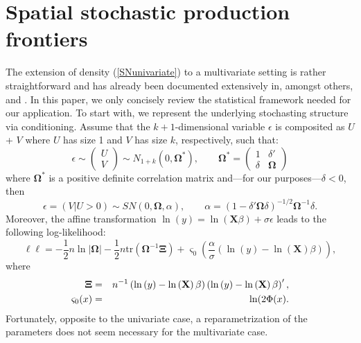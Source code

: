 \documentclass[11pt,parskip,abstracton,notitlepage]{scrartcl}
\begin{document}
\section{Spatial stochastic production frontiers}\label{sub:multisn}
%
The extension of density (\ref{SNunivariate}) to a multivariate setting is rather straightforward and has already been documented extensively in, amongst others, \citet{AZZALINI1999} \citet{AZZALINI2005} and \citet{arellano2006unification}. In this paper, we only concisely review the statistical framework needed for our application. To start with, we represent the underlying stochasting structure via conditioning. Assume that the $k+1$-dimensional variable $\epsilon $ is composited as $U$ + $V$ where $U$ has size 1 and $V$ has size $k$, respectively, such that:
\begin{equation}
\epsilon   \sim \begin{pmatrix} U \\ V \end{pmatrix} \sim N_{1+k}\left(0,\mathbf{\Omega}^\ast\right), \qquad \mathbf{\Omega}^\ast=\begin{pmatrix} 1 & \delta' \\ \delta & \mathbf{\Omega} \end{pmatrix}
\label{stocstruc}
\end{equation}
where $\mathbf{\Omega}^\ast$ is a positive definite correlation matrix and---for our purposes---$\delta<0$, then 
\begin{equation}
\epsilon  = (V|U >0) \sim SN(0, \mathbf{\Omega}, \alpha), \qquad \alpha = (1- \delta'\mathbf{\Omega}\delta)^{-1/2}\mathbf{\Omega}^{-1}\delta.
\end{equation}
Moreover, the affine transformation $\ln(y) = \ln \left(\mathbf{X} \beta\right) + \sigma \epsilon $ leads to the following log-likelihood:
\begin{equation}
\ell\ell  = -\frac{1}{2}n \ln |\mathbf{\Omega}| - \frac{1}{2}n \text{tr} (\mathbf{\Omega}^{-1}\mathbf{\Xi}) + 
 \varsigma_0 \left( \frac{\alpha}{\sigma} \left(\ln \left(y\right)  -\ln \left(\mathbf{X}\right) \beta \right) \right),
 \label{ll}
\end{equation}
where 
\begin{eqnarray}
\mathbf{\Xi} &=& n^{-1}\left(\ln \left(y\right)  -\ln \left(\mathbf{X}\right) \beta \right)\left(\ln \left(y\right)  -\ln \left(\mathbf{X}\right) \beta \right)', \notag \\
\varsigma_0(x)&=&\ln(2\Phi(x). \notag
\end{eqnarray}
%
Fortunately, opposite to the univariate case, a reparametrization of the parameters does not seem necessary for the multivariate case. 
\end{document}

